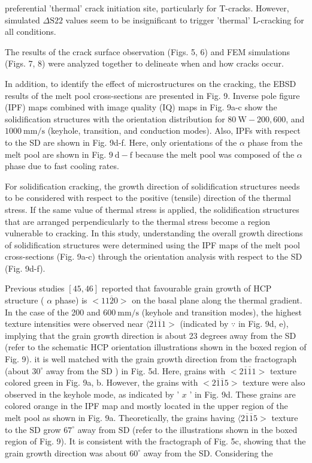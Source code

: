 \documentclass[10pt]{article}
\begin{document}
preferential 'thermal' crack initiation site, particularly for T-cracks. However, simulated $\Delta \mathrm{S} 22$ values seem to be insignificant to trigger 'thermal' L-cracking for all conditions.

The results of the crack surface observation (Figs. 5, 6) and FEM simulations (Figs. 7, 8) were analyzed together to delineate when and how cracks occur.

In addition, to identify the effect of microstructures on the cracking, the EBSD results of the melt pool cross-sections are presented in Fig. 9. Inverse pole figure (IPF) maps combined with image quality (IQ) maps in Fig. 9a-c show the solidification structures with the orientation distribution for $80 \mathrm{~W}-200,600$, and $1000 \mathrm{~mm} / \mathrm{s}$ (keyhole, transition, and conduction modes). Also, IPFs with respect to the SD are shown in Fig. 9d-f. Here, only orientations of the $\alpha$ phase from the melt pool are shown in Fig. $9 \mathrm{~d}-\mathrm{f}$ because the melt pool was composed of the $\alpha$ phase due to fast cooling rates.

For solidification cracking, the growth direction of solidification structures needs to be considered with respect to the positive (tensile) direction of the thermal stress. If the same value of thermal stress is applied, the solidification structures that are arranged perpendicularly to the thermal stress become a region vulnerable to cracking. In this study, understanding the overall growth directions of solidification structures were determined using the IPF maps of the melt pool cross-sections (Fig. 9a-c) through the orientation analysis with respect to the SD (Fig. 9d-f).

Previous studies $[45,46]$ reported that favourable grain growth of HCP structure ( $\alpha$ phase) is $<11 \overline{2} 0>$ on the basal plane along the thermal gradient. In the case of the 200 and $600 \mathrm{~mm} / \mathrm{s}$ (keyhole and transition modes), the highest texture intensities were observed near $\langle 2 \overline{1} \overline{1} 1>$ (indicated by $\because$ in Fig. 9d, e), implying that the grain growth direction is about 23 degrees away from the SD (refer to the schematic HCP orientation illustrations shown in the boxed region of Fig. 9). it is well matched with the grain growth direction from the fractograph (about $30^{\circ}$ away from the $\mathrm{SD}$ ) in Fig. 5d. Here, grains with $<2 \overline{1} \overline{1} 1>$ texture colored green in Fig. 9a, b. However, the grains with $<2 \overline{1} \overline{1} 5>$ texture were also observed in the keyhole mode, as indicated by ' $x$ ' in Fig. 9d. These grains are colored orange in the IPF map and mostly located in the upper region of the melt pool as shown in Fig. 9a. Theoretically, the grains having $\langle 2 \overline{1} \overline{1} 5>$ texture to the $\mathrm{SD}$ grow $67^{\circ}$ away from $\mathrm{SD}$ (refer to the illustrations shown in the boxed region of Fig. 9). It is consistent with the fractograph of Fig. 5c, showing that the grain growth direction was about $60^{\circ}$ away from the SD. Considering the
\end{document}
